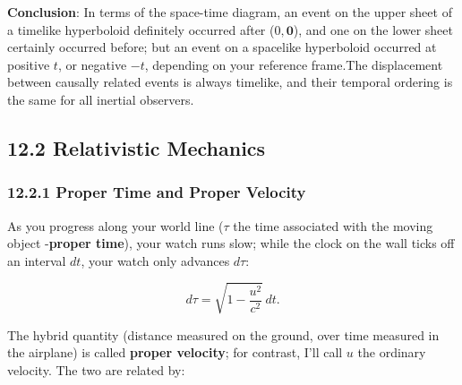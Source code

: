 \documentclass[12pt]{book}
\begin{document}
\begin{enumerate}
\begin{center}
            \end{center}

             \textbf{Conclusion}: In terms of the space-time diagram, an event on the upper sheet of a timelike hyperboloid definitely occurred after (\( 0, \bm{0} \)), and one on the lower sheet certainly occurred before; but an event on a spacelike hyperboloid occurred at positive $t$, or negative $-t$, depending on your reference frame.The displacement between causally related events is always timelike, and their temporal ordering is the same for all inertial observers.
        \end{enumerate}

\subsection{12.2 Relativistic Mechanics}

    \subsubsection{12.2.1 Proper Time and Proper Velocity}      
        As you progress along your world line (\(\tau\) the time associated with the moving object -\textbf{proper time}), your watch runs slow; while the clock on the wall ticks off an interval \(dt\), your watch only advances \(d\tau\):
        
        \[
        d\tau = \sqrt{1 - \frac{u^2}{c^2}} \, dt.
        \]
        
        The hybrid quantity (distance measured on the ground, over time measured in the airplane) is called \textbf{proper velocity}; for contrast, I’ll call \(u\) the ordinary velocity. The two are related by:
        
\end{document}
